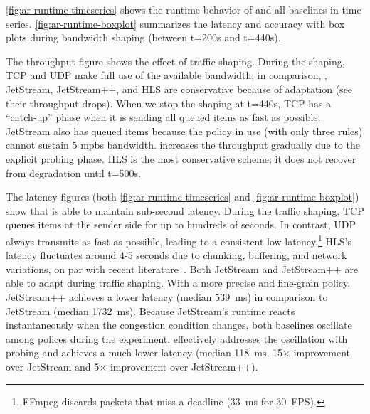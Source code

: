  \autoref{fig:ar-runtime-timeseries} shows the runtime behavior
of \sysname{} and all baselines in time series. \autoref{fig:ar-runtime-boxplot}
summarizes the latency and accuracy with box plots during bandwidth shaping
(between t=200s and t=440s).

The throughput figure shows the effect of traffic shaping. During the shaping,
TCP and UDP make full use of the available bandwidth; in comparison, \sysname{},
JetStream, JetStream++, and HLS are conservative because of adaptation (see
their throughput drops). When we stop the shaping at t=440s, TCP has a
``catch-up'' phase when it is sending all queued items as fast as
possible. JetStream also has queued items because the policy in use (with only
three rules) cannot sustain 5 mpbs bandwidth. \sysname{} increases the
throughput gradually due to the explicit probing phase. HLS is the most
conservative scheme; it does not recover from degradation until t=500s.


The latency figures (both \autoref{fig:ar-runtime-timeseries} and
\autoref{fig:ar-runtime-boxplot}) show that \sysname{} is able to maintain
sub-second latency. During the traffic shaping, TCP queues items at the sender
side for up to hundreds of seconds. In contrast, UDP always transmits as fast as
possible, leading to a consistent low latency.\footnote{FFmpeg discards packets
  that miss a deadline (\SI{33}{\ms} for \SI{30}{FPS}).} HLS's latency
fluctuates around 4-5 seconds due to chunking, buffering, and network
variations, on par with recent literature~\cite{wang2016anatomy}. Both JetStream
and JetStream++ are able to adapt during traffic shaping. With a more precise
and fine-grain policy, JetStream++ achieves a lower latency (median
\SI{539}{\ms}) in comparison to JetStream (median \SI{1732}{\ms}). Because
JetStream's runtime reacts instantaneously when the congestion condition
changes, both baselines oscillate among polices during the
experiment. \sysname{} effectively addresses the oscillation with probing and
achieves a much lower latency (median \SI{118}{\ms}, 15$\times$ improvement over
JetStream and 5$\times$ improvement over JetStream++).

